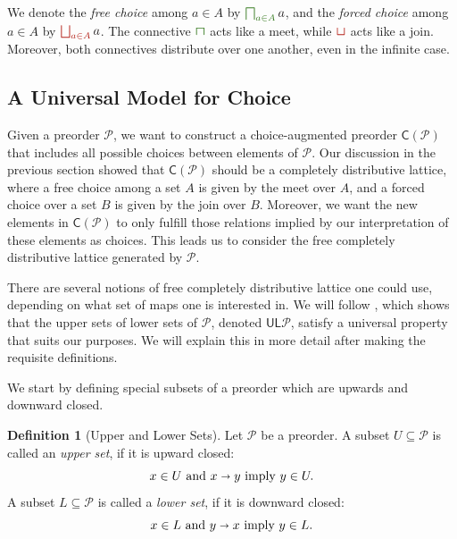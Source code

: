 \documentclass[12pt]{article}
\theoremstyle{definition}
\newtheorem{definition}{Definition}[section]
\theoremstyle{plain}
\theoremstyle{plain}
\theoremstyle{plain}
\theoremstyle{plain}
\theoremstyle{remark}
\theoremstyle{remark}
\newcommand{\mc}[1]{\mathcal{#1}}
\newcommand{\sub}{\subseteq}
\newcommand{\low}{\mathsf{L}}
\newcommand{\upper}{\mathsf{U}}
\newcommand{\cbigsqcap}[1]{\color{OliveGreen}\bigsqcap_{#1}\color{Black}}
\newcommand{\csqcap}{\color{OliveGreen}\bm{\sqcap}\color{Black}}
\newcommand{\cbigsqcup}[1]{\color{BrickRed}\bigsqcup_{#1}\color{Black}}
\newcommand{\csqcup}{\color{BrickRed}\bm{\sqcup}\color{Black}}
\begin{document}
\begin{tcolorbox}[title=Choice Connectives, colframe=Apricot, colback = paleorange, coltitle = Sepia]
	We denote the \emph{free choice} among $a \in A$ by $\cbigsqcap{a \in A} a$, and 
	the \emph{forced choice} among $a \in A$ by $\cbigsqcup{a \in A} a$. The connective $\csqcap{}$ acts like a meet, while $\csqcup{}$ acts like a join. Moreover, both connectives distribute over one another, even in the infinite case.
\end{tcolorbox}

\subsection{A Universal Model for Choice}
Given a preorder $\mc{P}$, we want to construct a choice-augmented preorder $\mathsf{C}(\mc{P})$ that includes all possible choices between elements of $\mc{P}$. Our discussion in the previous section showed that $\mathsf{C}(\mc{P})$ should be a completely distributive lattice, where a free choice among a set $A$ is given by the meet over $A$, and a forced choice over a set $B$ is given by the join over $B$. Moreover, we want the new elements in $\mathsf{C}(\mc{P})$ to only fulfill those relations implied by our interpretation of these elements as choices. This leads us to consider the free completely distributive lattice generated by $\mc{P}$.

There are several notions of free completely distributive lattice one could use, depending on what set of maps one is interested in. We will follow \cite{Morris2004}, which shows that the upper sets of lower sets of $\mc{P}$, denoted $\upper\low\mc{P}$, satisfy a universal property that suits our purposes. We will explain this in more detail after making the requisite definitions.

We start by defining special subsets of a preorder which are upwards and downward closed.
\begin{definition}[Upper and Lower Sets]
	Let $\mc{P}$ be a preorder. A subset $U \sub \mc{P}$ is called an \emph{upper set}, if it is upward closed: 
	$$x \in U \text{ and } x \shortrightarrow y  \text{ imply } y \in U.$$
	A subset $L \sub \mc{P}$ is called a \emph{lower set}, if it is downward closed:
	$$x \in L \text{ and } y \shortrightarrow x  \text{ imply } y \in L.$$
\end{definition}
\end{document}
